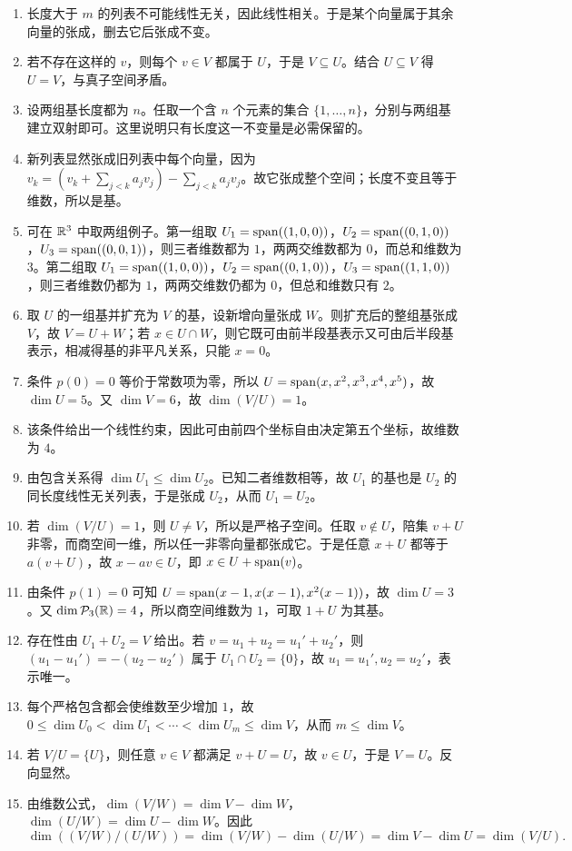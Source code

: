 \begin{enumerate}[label=\textbf{\hard\ \arabic*.}, leftmargin=3em]
\item 长度大于 $m$ 的列表不可能线性无关，因此线性相关。于是某个向量属于其余向量的张成，删去它后张成不变。
\item 若不存在这样的 $v$，则每个 $v\in V$ 都属于 $U$，于是 $V\subseteq U$。结合 $U\subseteq V$ 得 $U=V$，与真子空间矛盾。
\item 设两组基长度都为 $n$。任取一个含 $n$ 个元素的集合 $\{1,\dots,n\}$，分别与两组基建立双射即可。这里说明只有长度这一不变量是必需保留的。
\item 新列表显然张成旧列表中每个向量，因为 $v_k=(v_k+\sum_{j<k}a_jv_j)-\sum_{j<k}a_jv_j$。故它张成整个空间；长度不变且等于维数，所以是基。
\item 可在 $\mathbb{R}^3$ 中取两组例子。第一组取 $U_1=\operatorname{span}((1,0,0))$，$U_2=\operatorname{span}((0,1,0))$，$U_3=\operatorname{span}((0,0,1))$，则三者维数都为 $1$，两两交维数都为 $0$，而总和维数为 $3$。第二组取 $U_1=\operatorname{span}((1,0,0))$，$U_2=\operatorname{span}((0,1,0))$，$U_3=\operatorname{span}((1,1,0))$，则三者维数仍都为 $1$，两两交维数仍都为 $0$，但总和维数只有 $2$。
\item 取 $U$ 的一组基并扩充为 $V$ 的基，设新增向量张成 $W$。则扩充后的整组基张成 $V$，故 $V=U+W$；若 $x\in U\cap W$，则它既可由前半段基表示又可由后半段基表示，相减得基的非平凡关系，只能 $x=0$。
\item 条件 $p(0)=0$ 等价于常数项为零，所以 $U=\operatorname{span}(x,x^2,x^3,x^4,x^5)$，故 $\dim U=5$。又 $\dim V=6$，故 $\dim(V/U)=1$。
\item 该条件给出一个线性约束，因此可由前四个坐标自由决定第五个坐标，故维数为 $4$。
\item 由包含关系得 $\dim U_1\le\dim U_2$。已知二者维数相等，故 $U_1$ 的基也是 $U_2$ 的同长度线性无关列表，于是张成 $U_2$，从而 $U_1=U_2$。
\item 若 $\dim(V/U)=1$，则 $U\neq V$，所以是严格子空间。任取 $v\notin U$，陪集 $v+U$ 非零，而商空间一维，所以任一非零向量都张成它。于是任意 $x+U$ 都等于 $a(v+U)$，故 $x-av\in U$，即 $x\in U+\operatorname{span}(v)$。
\item 由条件 $p(1)=0$ 可知 $U=\operatorname{span}(x-1,x(x-1),x^2(x-1))$，故 $\dim U=3$。又 $\dim\mathcal{P}_3(\mathbb{R})=4$，所以商空间维数为 $1$，可取 $1+U$ 为其基。
\item 存在性由 $U_1+U_2=V$ 给出。若 $v=u_1+u_2=u_1'+u_2'$，则 $(u_1-u_1')=-(u_2-u_2')$ 属于 $U_1\cap U_2=\{0\}$，故 $u_1=u_1',u_2=u_2'$，表示唯一。
\item 每个严格包含都会使维数至少增加 $1$，故 $0\le\dim U_0<\dim U_1<\cdots<\dim U_m\le\dim V$，从而 $m\le\dim V$。
\item 若 $V/U=\{U\}$，则任意 $v\in V$ 都满足 $v+U=U$，故 $v\in U$，于是 $V=U$。反向显然。
\item 由维数公式，$\dim(V/W)=\dim V-\dim W$，$\dim(U/W)=\dim U-\dim W$。因此
\[ \dim((V/W)/(U/W))=\dim(V/W)-\dim(U/W)=\dim V-\dim U=\dim(V/U). \]
\end{enumerate}

